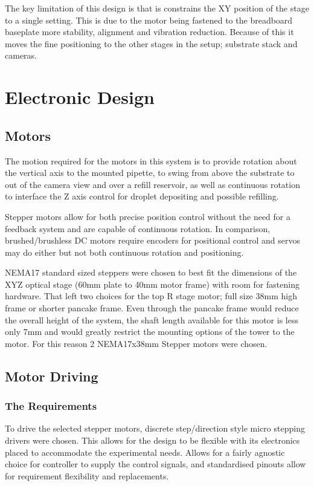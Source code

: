 The key limitation of this design is that is constrains the XY position of the stage to a single setting. This is due to the motor being fastened to the breadboard baseplate more stability, alignment and vibration reduction. Because of this it moves the fine positioning to the other stages in the setup; substrate stack and cameras. 

\section{Electronic Design}

\subsection{Motors}
The motion required for the motors in this system is to provide rotation about the vertical axis to the mounted pipette, to swing from above the substrate to out of the camera view and over a refill reservoir, as well as continuous rotation to interface the Z axis control for droplet depositing and possible refilling.

Stepper motors allow for both precise position control without the need for a feedback system and are capable of continuous rotation. In comparison, brushed/brushless DC motors require encoders for positional control and servos may do either but not both continuous rotation and positioning.

NEMA17 standard sized steppers were chosen to best fit the dimensions of the XYZ optical stage (60mm plate to 40mm motor frame) with room for fastening hardware. That left two choices for the top R stage motor; full size 38mm high frame or shorter pancake frame. Even through the pancake frame would reduce the overall height of the system, the shaft length available for this motor is less only 7mm and would greatly restrict the mounting options of the tower to the motor. For this reason 2 NEMA17x38mm Stepper motors were chosen.

\subsection{Motor Driving}

\subsubsection*{The Requirements}
To drive the selected stepper motors, discrete step/direction style micro stepping drivers were chosen. This allows for the design to be flexible with its electronics placed to accommodate the experimental needs. Allows for a fairly agnostic choice for controller to supply the control signals, and standardised pinouts allow for requirement flexibility and replacements.

